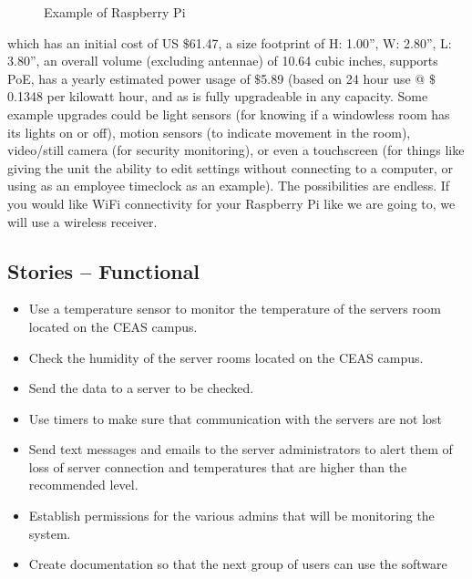 \documentclass{report}
\begin{document}
\begin{figure}[H]
\caption{Example of Raspberry Pi}
\end{figure}
which has an initial cost of US $\$$61.47, a size footprint of H: 1.00”, W: 2.80”, L: 3.80”, an overall volume (excluding antennae) of 10.64 cubic inches, supports PoE, has a yearly estimated power usage of $\$$5.89 (based on 24 hour use @ $\$$0.1348 per kilowatt hour, and as is fully upgradeable in any capacity.
Some example upgrades could be light sensors (for knowing if a windowless room has its lights on or off), motion sensors (to indicate movement in the room), video/still camera (for security monitoring), or even a touchscreen (for things like giving the unit the ability to edit settings without connecting to a computer, or using as an employee timeclock as an example).
The possibilities are endless.
If you would like WiFi connectivity for your Raspberry Pi like we are going to, we will use a wireless receiver.
\newpage
\subsection*{Stories -- Functional}
\begin {itemize}
\item Use a temperature sensor to monitor the temperature of the servers room located on the CEAS campus.
\item Check the humidity of the server rooms located on the CEAS campus.
\item Send the data to a server to be checked.
\item Use timers to make sure that communication with the servers are not lost
\item Send text messages and emails to the server administrators to alert them of loss of server connection and temperatures that are higher than the recommended level.
\item Establish permissions for the various admins that will be monitoring the system.
\item Create documentation so that the next group of users can use the software
\end {itemize}
\newpage
\end{document}
